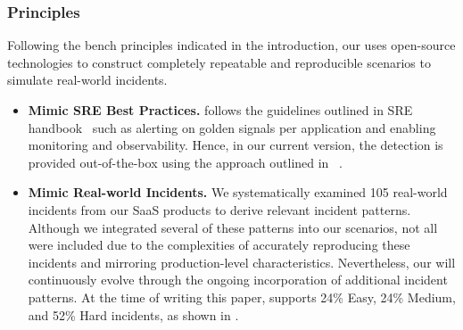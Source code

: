 \subsubsection{Principles}
Following the bench principles indicated in the introduction, our \bench uses open-source technologies to construct completely repeatable and reproducible scenarios to simulate real-world incidents. 
\begin{itemize}[left=0pt, topsep=0pt, partopsep=0pt, itemsep=0pt, parsep=0pt]
    \item \textbf{Mimic SRE Best Practices.} \bench follows the guidelines outlined in SRE handbook~\cite{srehandbook} such as alerting on golden signals per application and enabling monitoring and observability. 
    Hence, in our current version, the detection is provided out-of-the-box using the approach outlined in ~\cite{srehandbook}.
    \item \textbf{Mimic Real-world Incidents.} 
We systematically examined 105 real-world incidents from our SaaS products to derive relevant incident patterns. 
Although we integrated several of these patterns into our \bench scenarios, not all were included due to the complexities of accurately reproducing these incidents and mirroring production-level characteristics. Nevertheless, our \bench will continuously evolve through the ongoing incorporation of additional incident patterns.
At the time of writing this paper, \bench supports
    24\% Easy, 24\% Medium, and 52\% Hard incidents, as shown in . 

    
    

\end{itemize}
